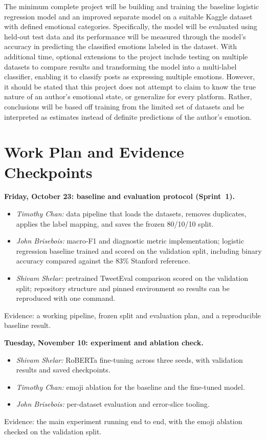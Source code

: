 \documentclass[sigconf,nonacm]{acmart}
\begin{document}
{The minimum complete project will be building and training the baseline logistic regression model and an improved separate model on a suitable Kaggle dataset with defined emotional categories. Specifically, the model will be evaluated using held-out test data and its performance will be measured through the model's accuracy in predicting the classified emotions labeled in the dataset. With additional time, optional extensions to the project include testing on multiple datasets to compare results and transforming the model into a multi-label classifier, enabling it to classify posts as expressing multiple emotions. However, it should be stated that this project does not attempt to claim to know the true nature of an author's emotional state, or generalize for every platform. Rather, conclusions will be based off training from the limited set of datasets and be interpreted as estimates instead of definite predictions of the author's emotion.

\section{Work Plan and Evidence Checkpoints}
\textbf{Friday, October 23: baseline and evaluation protocol (Sprint~1).}
\begin{itemize}
\item \emph{Timothy Chan:} data pipeline that loads the datasets, removes duplicates, applies the label mapping, and saves the frozen 80/10/10 split.
\item \emph{John Brisebois:} macro-F1 and diagnostic metric implementation; logistic regression baseline trained and scored on the validation split, including binary accuracy compared against the 83\% Stanford reference.
\item \emph{Shivam Shelar:} pretrained TweetEval comparison scored on the validation split; repository structure and pinned environment so results can be reproduced with one command.
\end{itemize}
Evidence: a working pipeline, frozen split and evaluation plan, and a reproducible baseline result.
 
\textbf{Tuesday, November 10: experiment and ablation check.}
\begin{itemize}
\item \emph{Shivam Shelar:} RoBERTa fine-tuning across three seeds, with validation results and saved checkpoints.
\item \emph{Timothy Chan:} emoji ablation for the baseline and the fine-tuned model.
\item \emph{John Brisebois:} per-dataset evaluation and error-slice tooling.
\end{itemize}
Evidence: the main experiment running end to end, with the emoji ablation checked on the validation split.
 
}
\end{document}
